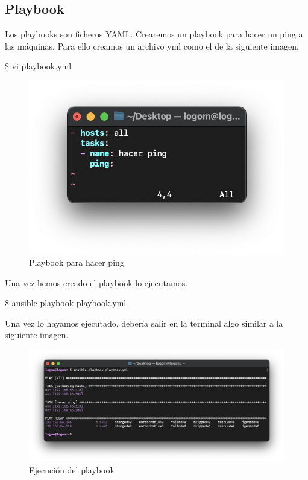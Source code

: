 \subsection{Playbook}
Los playbooks son ficheros YAML. Crearemos un playbook para hacer un ping a las máquinas. Para ello creamos un archivo
yml como el de la siguiente imagen.
    \begin{tcolorbox}[colback=black!10, halign=left]
        \$ vi playbook.yml
    \end{tcolorbox}

    \begin{figure}[H]
        \centering
        \includegraphics[scale=0.8]{images/playbook.png}
        \caption{Playbook para hacer ping}
        \label{fig:playbook}
    \end{figure}

Una vez hemos creado el playbook lo ejecutamos.
    \begin{tcolorbox}[colback=black!10, halign=left]
        \$ ansible-playbook playbook.yml
    \end{tcolorbox}

Una vez lo hayamos ejecutado, debería salir en la terminal algo similar a la siguiente imagen.
    \begin{figure}[H]
        \centering
        \includegraphics[scale=0.45]{images/ejecucion_playbook.png}
        \caption{Ejecución del playbook}
        \label{fig:ejecucion_playbook}
    \end{figure}


